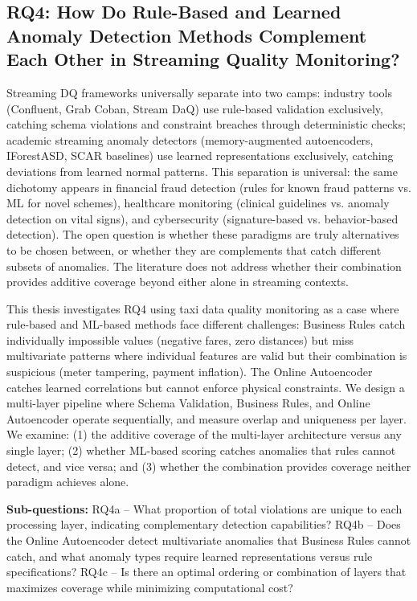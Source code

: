 \subsection{RQ4: How Do Rule-Based and Learned Anomaly Detection Methods Complement Each Other in Streaming Quality Monitoring?}

Streaming DQ frameworks universally separate into two camps: industry tools (Confluent, Grab Coban, Stream DaQ) use rule-based validation exclusively, catching schema violations and constraint breaches through deterministic checks; academic streaming anomaly detectors (memory-augmented autoencoders, IForestASD, SCAR baselines) use learned representations exclusively, catching deviations from learned normal patterns. This separation is universal: the same dichotomy appears in financial fraud detection (rules for known fraud patterns vs. ML for novel schemes), healthcare monitoring (clinical guidelines vs. anomaly detection on vital signs), and cybersecurity (signature-based vs. behavior-based detection). The open question is whether these paradigms are truly alternatives to be chosen between, or whether they are complements that catch different subsets of anomalies. The literature does not address whether their combination provides additive coverage beyond either alone in streaming contexts.

This thesis investigates RQ4 using taxi data quality monitoring as a case where rule-based and ML-based methods face different challenges: Business Rules catch individually impossible values (negative fares, zero distances) but miss multivariate patterns where individual features are valid but their combination is suspicious (meter tampering, payment inflation). The Online Autoencoder catches learned correlations but cannot enforce physical constraints. We design a multi-layer pipeline where Schema Validation, Business Rules, and Online Autoencoder operate sequentially, and measure overlap and uniqueness per layer. We examine: (1) the additive coverage of the multi-layer architecture versus any single layer; (2) whether ML-based scoring catches anomalies that rules cannot detect, and vice versa; and (3) whether the combination provides coverage neither paradigm achieves alone.

\textbf{Sub-questions:} RQ4a -- What proportion of total violations are unique to each processing layer, indicating complementary detection capabilities? RQ4b -- Does the Online Autoencoder detect multivariate anomalies that Business Rules cannot catch, and what anomaly types require learned representations versus rule specifications? RQ4c -- Is there an optimal ordering or combination of layers that maximizes coverage while minimizing computational cost?

